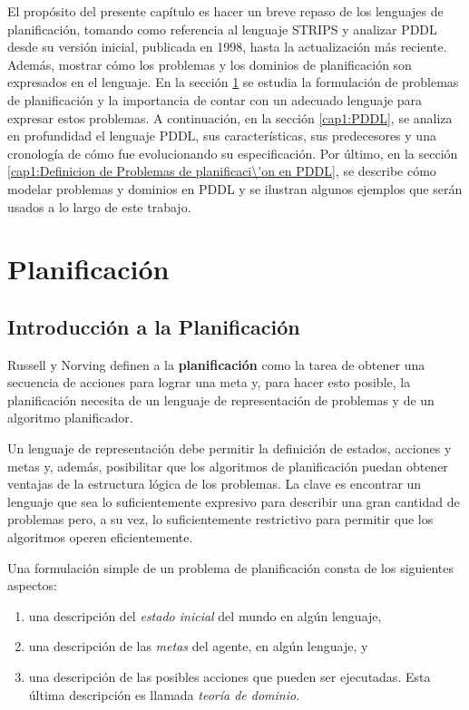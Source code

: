 El prop\'osito del presente cap\'itulo es hacer un breve repaso de los lenguajes de planificaci\'on, 
tomando como referencia al lenguaje STRIPS y analizar PDDL desde 
su versi\'on inicial, publicada en 1998, hasta la actualizaci\'on m\'as
reciente. Adem\'as, mostrar c\'omo los problemas y los dominios de
planificaci\'on son expresados en el lenguaje.
En la secci\'on \ref{cap1:Lenguajes de planificaci\'on} se estudia
la formulaci\'on de 
problemas de planificaci\'on y la importancia de contar con un adecuado lenguaje 
para expresar estos problemas. A continuaci\'on, en la secci\'on \ref{cap1:PDDL}, 
se analiza en profundidad el lenguaje PDDL, sus caracter\'isticas, sus predecesores 
y una cronolog\'ia de c\'omo fue evolucionando su especificaci\'on. 
Por \'ultimo, en la secci\'on \ref{cap1:Definicion de Problemas de planificaci\'on en PDDL}, 
se describe c\'omo modelar problemas y dominios en PDDL y se ilustran algunos ejemplos 
que ser\'an usados a lo largo de este trabajo.


\section{Planificaci\'on} \label{cap1:Lenguajes de planificaci\'on}


\subsection{Introducci\'on a la Planificaci\'on}

Russell y Norving \cite{gbraun:Rus09} definen a la {\bf planificaci\'on} como la tarea de
obtener una secuencia de acciones para lograr una meta y, para
hacer esto posible, la planificaci\'on necesita de un lenguaje de representaci\'on
de problemas y de un algoritmo planificador. 

Un lenguaje de representaci\'on debe permitir la definici\'on de estados, acciones
y metas y, adem\'as, posibilitar que los algoritmos de planificaci\'on
puedan obtener ventajas de la estructura l\'ogica de los problemas.
La clave es encontrar un lenguaje que sea lo suficientemente expresivo
para describir una gran cantidad de problemas pero, a su vez, lo suficientemente
restrictivo para permitir que los algoritmos operen eficientemente.

Una formulaci\'on simple de un problema de planificaci\'on consta de
los siguientes aspectos:

\begin{enumerate}

\item una descripci\'on del \emph{estado inicial} del mundo en alg\'un lenguaje,

\item una descripci\'on de las \emph{metas} del agente, en alg\'un lenguaje, y

\item una descripci\'on de las posibles acciones que pueden ser ejecutadas. 
Esta \'ultima descripci\'on es llamada \emph{teor\'ia de dominio}.

\end{enumerate} %

